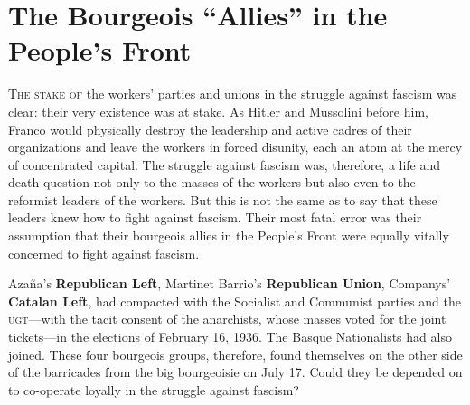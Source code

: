 \chapter{The Bourgeois “Allies” in the People's Front}

\textsc{The stake of} the workers’ parties and unions in the struggle against fascism was clear: their very existence was at stake. As Hitler and Mussolini before him, Franco would physically destroy the leadership and active cadres of their organizations and leave the workers in forced disunity, each an atom at the mercy of concentrated capital. The struggle against fascism was, therefore, a life and death question not only to the masses of the workers but also even to the reformist leaders of the workers. But this is not the same as to say that these leaders knew how to fight against fascism. Their most fatal error was their assumption that their bourgeois allies in the People’s Front were equally vitally concerned to fight against fascism.

{\sloppy Azaña's \textbf{Republican Left}, Martinet Barrio's \textbf{Republican Union}, Companys' \textbf{Catalan Left}, had compacted with the Socialist and Communist parties and the \textsc{ugt}---with the tacit consent of the anarchists, whose masses voted for the joint tickets---in the elections of February 16, 1936. The Basque Nationalists had also joined. These four bourgeois groups, therefore, found themselves on the other side of the barricades from the big bourgeoisie on July 17. Could they be depended on to co-operate loyally in the struggle against fascism? \par}

